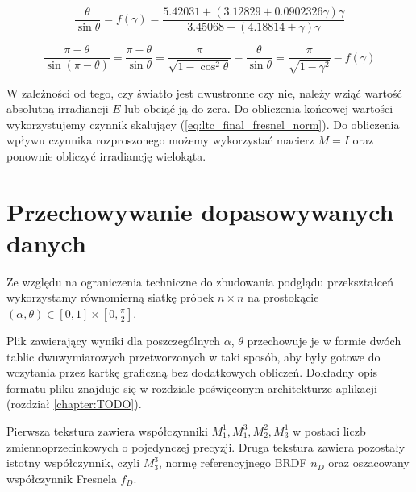 \documentclass[../main.tex]{subfiles}
\begin{document}
\begin{equation}
\frac{\theta}{\sin\theta} = f(\gamma) = \frac{
    5.42031 + \left( 3.12829 + 0.0902326 \gamma \right) \gamma
}{
    3.45068 + \left( 4.18814 + \gamma \right) \gamma
}
\label{ltc_gamma_approx_positive}
\end{equation}

\begin{equation}
    \frac{\pi - \theta}{\sin\left( \pi-\theta \right)} =
    \frac{\pi - \theta}{\sin\theta} = 
    \frac{\pi}{\sqrt{1-\cos^{2}\theta}} - \frac{\theta}{\sin\theta} =
    \frac{\pi}{\sqrt{1-\gamma^2}} - f(\gamma)
\label{ltc_gamma_approx_negative}
\end{equation}

W zależności od tego, czy światło jest dwustronne czy nie, należy wziąć wartość absolutną irradiancji $E$ lub obciąć ją do zera. Do obliczenia końcowej wartości wykorzystujemy czynnik skalujący (\ref{eq:ltc_final_fresnel_norm}). Do obliczenia wpływu czynnika rozproszonego możemy wykorzystać macierz $M = I$ oraz ponownie obliczyć irradiancję wielokąta.

\section{Przechowywanie dopasowywanych danych}

Ze względu na ograniczenia techniczne do zbudowania podglądu przekształceń wykorzystamy równomierną siatkę próbek $n \times n$ na prostokącie $(\alpha, \theta) \in \left[0,1\right] \times \left[0, \frac{\pi}{2}\right]$.

Plik zawierający wyniki dla poszczególnych $\alpha$, $\theta$ przechowuje je w formie dwóch tablic dwuwymiarowych przetworzonych w taki sposób, aby były gotowe do wczytania przez kartkę graficzną bez dodatkowych obliczeń. Dokładny opis formatu pliku znajduje się w rozdziale poświęconym architekturze aplikacji (rozdział \ref{chapter:TODO}).

Pierwsza tekstura zawiera współczynniki $M_{1}^{1}, M_{1}^{3}, M_{2}^{2}, M_{3}^{1}$ w postaci liczb zmiennoprzecinkowych o pojedynczej precyzji. Druga tekstura zawiera pozostały istotny współczynnik, czyli $M_{3}^{3}$, normę referencyjnego BRDF $n_D$ oraz oszacowany współczynnik Fresnela $f_D$.
\end{document}
